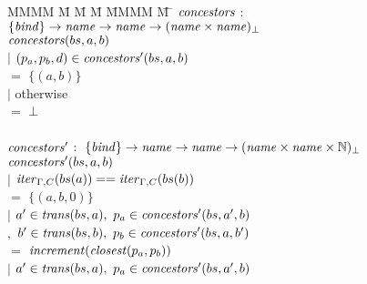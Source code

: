 \begin{figure}
%
\begin{tabbing}
MMMM \= M \= M \= M \= MMMM \= M \= \kill
$\mathit{concestors}$ \> $:$ \> $\{\mathit{bind}\} \to \mathit{name} \to \mathit{name} \to (\mathit{name} \times \mathit{name})_\bot$ \\
$\mathit{concestors}(bs, a, b)$ \\
        \> $|$ \> $(p_a,p_b,d) \in \mathit{concestors}'(bs,a,b)$ \\
        \>     \>                      \> $=$ \> $\{(a, b)\}$ \\
        \> $|$ \> otherwise \\
        \>     \>                      \> $=$    \> $\bot$ \\
\\
$\mathit{concestors}'$ \> $:$ \> $\{\mathit{bind}\} \to \mathit{name} \to \mathit{name} \to (\mathit{name} \times \mathit{name} \times \mathbb{N})_\bot$ \\
$\mathit{concestors}'(bs, a, b)$ \\
        \> $|$ \> $\mathit{iter}_{\Gamma,C}(bs(a)) == \mathit{iter}_{\Gamma,C}(bs(b))$ \\
        \>     \>                      \> $=$ \> $\{(a, b, 0)\}$ \\
        \> $|$ \> $a' \in \mathit{trans}(bs,a),~ p_a \in \mathit{concestors}'(bs,a',b)$ \\
        \> $,$ \> $b' \in \mathit{trans}(bs,b),~ p_b \in \mathit{concestors}'(bs,a,b')$ \\
        \>     \>                      \> $=$ \> $\mathit{increment}(\mathit{closest}(p_a, p_b))$ \\
        \> $|$ \> $a' \in \mathit{trans}(bs,a),~ p_a \in \mathit{concestors}'(bs,a',b)$ \\

\end{tabbing}
\end{figure}
